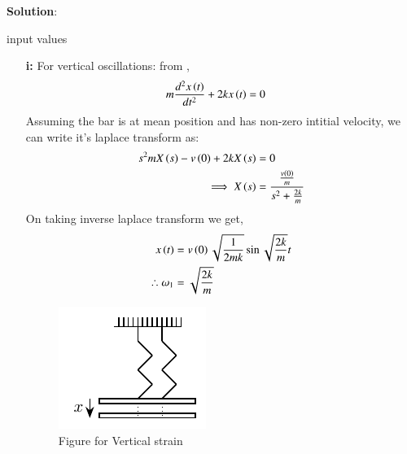 \documentclass[journal,12pt,twocolumn]{IEEEtran}
\theoremstyle{remark}
\begin{document}
\textbf{Solution}:\\
\begin{table}[h!] 
\centering

\caption{input values}
\label{tab: Table ae63}
\end{table}
\begin{enumerate}
    \item [\textbf{i:}] For vertical oscillations: from ,
    \begin{align}
        m\frac{d^2x\left(t\right)}{dt^2} + 2kx\left(t\right) &=0
    \end{align}
    Assuming the bar is at mean position and has non-zero intitial velocity, we can write it's laplace transform as:
    \begin{align}
        s^2mX\left(s\right)-v\left(0\right)+ 2kX\left(s\right)&=0\\
        \implies X\left(s\right) &= \frac{\frac{v\left(0\right)}{m}}{s^2 + \frac{2k}{m}}
    \end{align}
    On taking inverse laplace transform we get,
    \begin{align}
        x\left(t\right) &= v\left(0\right)\sqrt{\frac{1}{2mk}}\sin{\sqrt{\frac{2k}{m}}t}\\
        \therefore \omega_1 &= \sqrt{\frac{2k}{m}} \label{eq:gate63_1}
    \end{align}

\begin{figure}[h!]
    \includegraphics[width = \columnwidth]{figs/fig1.pdf}
    \caption{Figure for Vertical strain}
    \centering
    \label{fig: nm_63_fig_2}
\end{figure}


\end{enumerate}
\end{document}
